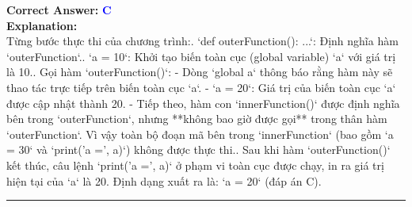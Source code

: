\documentclass[11pt,a4paper]{article}
\begin{document}
\begin{minipage}{\textwidth}
\noindent \textbf{Correct Answer:} \textcolor{blue}{\textbf{C}} \\[4pt]
\noindent \textbf{Explanation:}\\
Từng bước thực thi của chương trình:. `def outerFunction(): ...`: Định nghĩa hàm `outerFunction`.. `a = 10`: Khởi tạo biến toàn cục (global variable) `a` với giá trị là 10.. Gọi hàm `outerFunction()`:\newline
   - Dòng `global a` thông báo rằng hàm này sẽ thao tác trực tiếp trên biến toàn cục `a`.\newline
   - `a = 20`: Giá trị của biến toàn cục `a` được cập nhật thành 20.\newline
   - Tiếp theo, hàm con `innerFunction()` được định nghĩa bên trong `outerFunction`, nhưng **không bao giờ được gọi** trong thân hàm `outerFunction`. Vì vậy toàn bộ đoạn mã bên trong `innerFunction` (bao gồm `a = 30` và `print('a =', a)`) không được thực thi.. Sau khi hàm `outerFunction()` kết thúc, câu lệnh `print('a =', a)` ở phạm vi toàn cục được chạy, in ra giá trị hiện tại của `a` là 20.\newline
Định dạng xuất ra là: `a = 20` (đáp án C).
\end{minipage}
\vspace{0.8cm}
\hrule
\vspace{0.5cm}
\end{document}
